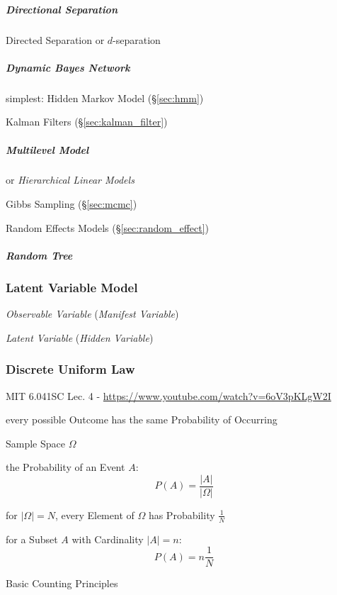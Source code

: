 \subparagraph{Directional Separation}\label{sec:directional_separation}\hfill

Directed Separation or $d$-separation



\subparagraph{Dynamic Bayes Network}\label{sec:dynamic_bayes_network}\hfill

simplest: Hidden Markov Model (\S\ref{sec:hmm})

Kalman Filters (\S\ref{sec:kalman_filter})



\subparagraph{Multilevel Model}\label{sec:multilevel_model}\hfill

or \emph{Hierarchical Linear Models}

Gibbs Sampling (\S\ref{sec:mcmc})

Random Effects Models (\S\ref{sec:random_effect})



\subparagraph{Random Tree}\label{sec:random_tree}\hfill



\subsubsection{Latent Variable Model}\label{sec:latent_variable_model}

\emph{Observable Variable} (\emph{Manifest Variable})

\emph{Latent Variable} (\emph{Hidden Variable})



\subsubsection{Discrete Uniform Law}\label{sec:discrete_uniform_law}

MIT 6.041SC Lec. 4 - \url{https://www.youtube.com/watch?v=6oV3pKLgW2I}

every possible Outcome has the same Probability of Occurring

Sample Space $\Omega$

the Probability of an Event $A$:
\[
  P(A) = \frac{|A|}{|\Omega|}
\]

for $|\Omega| = N$, every Element of $\Omega$ has Probability $\frac{1}{N}$

for a Subset $A$ with Cardinality $|A| = n$:
\[
  P(A) = n \frac{1}{N}
\]


Basic Counting Principles

